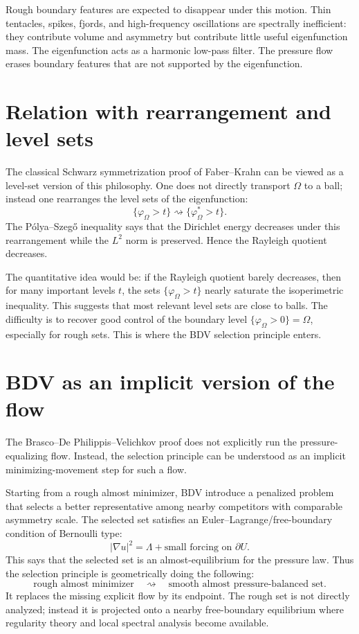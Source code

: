 \documentclass[11pt]{article}
\newcommand{\Om}{\Omega}
\begin{document}
Rough boundary features are expected to disappear under this motion. Thin tentacles, spikes, fjords, and high-frequency oscillations are spectrally inefficient: they contribute volume and asymmetry but contribute little useful eigenfunction mass. The eigenfunction acts as a harmonic low-pass filter. The pressure flow erases boundary features that are not supported by the eigenfunction.

\section{Relation with rearrangement and level sets}

The classical Schwarz symmetrization proof of Faber--Krahn can be viewed as a level-set version of this philosophy. One does not directly transport $\Om$ to a ball; instead one rearranges the level sets of the eigenfunction:
\[
    \{\varphi_\Om > t\} \rightsquigarrow \{\varphi_\Om^* > t\}.
\]
The P\'olya--Szeg\H{o} inequality says that the Dirichlet energy decreases under this rearrangement while the $L^2$ norm is preserved. Hence the Rayleigh quotient decreases.

The quantitative idea would be: if the Rayleigh quotient barely decreases, then for many important levels $t$, the sets $\{\varphi_\Om>t\}$ nearly saturate the isoperimetric inequality. This suggests that most relevant level sets are close to balls. The difficulty is to recover good control of the boundary level $\{\varphi_\Om>0\}=\Om$, especially for rough sets. This is where the BDV selection principle enters.

\section{BDV as an implicit version of the flow}

The Brasco--De Philippis--Velichkov proof does not explicitly run the pressure-equalizing flow. Instead, the selection principle can be understood as an implicit minimizing-movement step for such a flow.

Starting from a rough almost minimizer, BDV introduce a penalized problem that selects a better representative among nearby competitors with comparable asymmetry scale. The selected set satisfies an Euler--Lagrange/free-boundary condition of Bernoulli type:
\[
    |\nabla u|^2 = \Lambda + \text{small forcing on }\partial U.
\]
This says that the selected set is an almost-equilibrium for the pressure law. Thus the selection principle is geometrically doing the following:
\[
    \text{rough almost minimizer}
    \quad \rightsquigarrow \quad
    \text{smooth almost pressure-balanced set}.
\]
It replaces the missing explicit flow by its endpoint. The rough set is not directly analyzed; instead it is projected onto a nearby free-boundary equilibrium where regularity theory and local spectral analysis become available.
\end{document}
